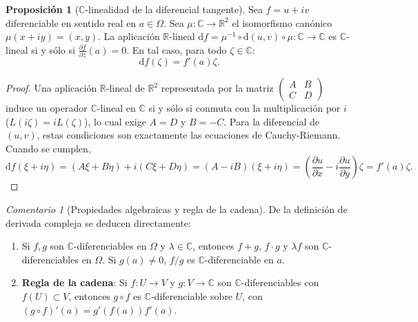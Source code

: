 \documentclass[11pt,a4paper]{article}
\theoremstyle{definition}
\newtheorem{proposicion}{Proposición}[section]
\theoremstyle{remark}
\newtheorem{observacion}{Comentario}[section]
\numberwithin{equation}{section}
\begin{document}
\begin{proposicion}[$\mathbb{C}$-linealidad de la diferencial tangente]
Sea $f = u+iv$ diferenciable en sentido real en $a \in \Omega$. Sea $\mu: \mathbb{C} \to \mathbb{R}^2$ el isomorfismo canónico $\mu(x+iy) = (x,y)$. La aplicación $\mathbb{R}$-lineal $\mathrm{d}f = \mu^{-1} \circ \mathrm{d}(u,v) \circ \mu: \mathbb{C} \to \mathbb{C}$ es $\mathbb{C}$-lineal si y sólo si $\frac{\partial f}{\partial \bar{z}}(a) = 0$. En tal caso, para todo $\zeta \in \mathbb{C}$:
\begin{equation}
\mathrm{d}f(\zeta) = f'(a)\zeta.
\end{equation}
\end{proposicion}
\begin{proof}
Una aplicación $\mathbb{R}$-lineal de $\mathbb{R}^2$ representada por la matriz $\begin{pmatrix} A & B \\ C & D \end{pmatrix}$ induce un operador $\mathbb{C}$-lineal en $\mathbb{C}$ si y sólo si conmuta con la multiplicación por $i$ ($L(i\zeta) = i L(\zeta)$), lo cual exige $A = D$ y $B = -C$. Para la diferencial de $(u,v)$, estas condiciones son exactamente las ecuaciones de Cauchy-Riemann. Cuando se cumplen,
\[
\mathrm{d}f(\xi + i\eta) = (A\xi + B\eta) + i(C\xi + D\eta) = (A - iB)(\xi + i\eta) = \left(\frac{\partial u}{\partial x} - i\frac{\partial u}{\partial y}\right)\zeta = f'(a)\zeta.
\]
\end{proof}

\begin{observacion}[Propiedades algebraicas y regla de la cadena]
De la definición de derivada compleja se deducen directamente:
\begin{enumerate}
\item Si $f, g$ son $\mathbb{C}$-diferenciables en $\Omega$ y $\lambda \in \mathbb{C}$, entonces $f+g$, $f \cdot g$ y $\lambda f$ son $\mathbb{C}$-diferenciables en $\Omega$. Si $g(a) \neq 0$, $f/g$ es $\mathbb{C}$-diferenciable en $a$.
\item \textbf{Regla de la cadena}: Si $f: U \to V$ y $g: V \to \mathbb{C}$ son $\mathbb{C}$-diferenciables con $f(U) \subset V$, entonces $g \circ f$ es $\mathbb{C}$-diferenciable sobre $U$, con $(g \circ f)'(a) = g'(f(a)) f'(a)$.
\end{enumerate}
\end{observacion}
\end{document}
